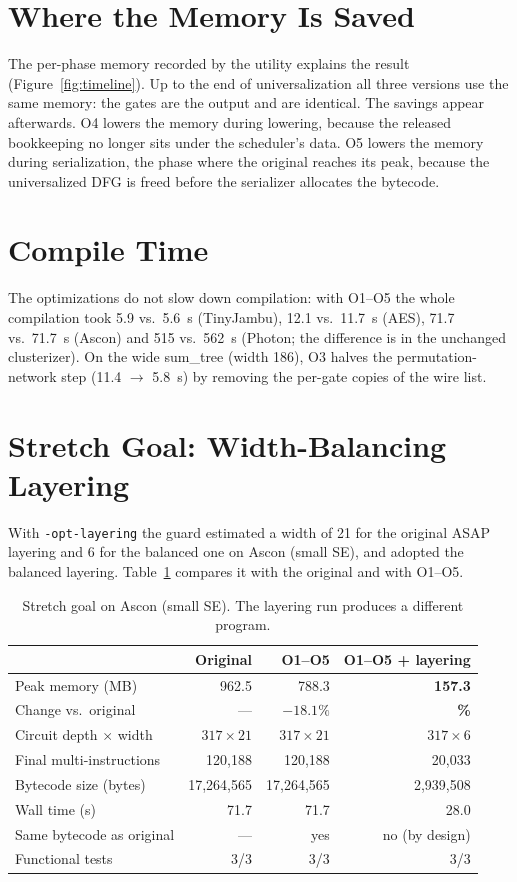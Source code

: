 \documentclass[12pt,a4paper,oneside]{report}
\newcommand{\code}[1]{\texttt{#1}}
\begin{document}
\section{Where the Memory Is Saved}
\label{sec:phase}
The per-phase memory recorded by the utility explains the result (Figure~\ref{fig:timeline}). Up to the end of
universalization all three versions use the same memory: the gates are the output and are
identical. The savings appear afterwards. O4 lowers the memory during lowering, because the
released bookkeeping no longer sits under the scheduler's data. O5 lowers the memory during
serialization, the phase where the original reaches its peak, because the universalized DFG is
freed before the serializer allocates the bytecode. 

\section{Compile Time}
The optimizations do not slow down compilation: with O1--O5 the whole compilation took 5.9 vs.\
5.6~s (TinyJambu), 12.1 vs.\ 11.7~s (AES), 71.7 vs.\ 71.7~s (Ascon) and 515 vs.\ 562~s (Photon; the
difference is in the unchanged clusterizer). On the wide sum\_tree (width 186), O3 halves the
permutation-network step (11.4 $\rightarrow$ 5.8~s) by removing the per-gate copies of the wire list.

\section{Stretch Goal: Width-Balancing Layering}
With \code{-opt-layering} the guard estimated a width of 21 for the original ASAP layering and 6
for the balanced one on Ascon (small SE), and adopted the balanced layering. Table~\ref{tab:layer}
compares it with the original and with O1--O5.

\begin{table}[H]
\centering\small
\caption{Stretch goal on Ascon (small SE). The layering run produces a different program.}
\label{tab:layer}
\begin{tabular}{@{}l r r r@{}}
\toprule
 & Original & O1--O5 & O1--O5 + layering\\ \midrule
Peak memory (MB) & 962.5 & 788.3 & \textbf{157.3}\\
Change vs.\ original & --- & $-18.1\%$ & \textbf{\textminus83.7\%}\\
Circuit depth $\times$ width & $317 \times 21$ & $317 \times 21$ & $317 \times 6$\\
Final multi-instructions & 120{,}188 & 120{,}188 & 20{,}033\\
Bytecode size (bytes) & 17{,}264{,}565 & 17{,}264{,}565 & 2{,}939{,}508\\
Wall time (s) & 71.7 & 71.7 & 28.0\\
Same bytecode as original & --- & yes & no (by design)\\
Functional tests & 3/3 & 3/3 & 3/3\\
\bottomrule
\end{tabular}
\end{table}
\end{document}
